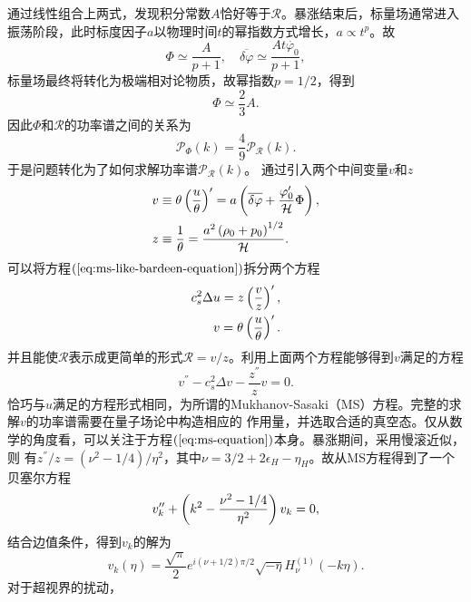 通过线性组合上两式，发现积分常数$A$恰好等于$\mathcal{R}$。暴涨结束后，标量场通常进入
振荡阶段，此时标度因子$a$以物理时间$t$的幂指数方式增长，$a\propto
t^{p}$。故
\begin{equation}
  \Phi \simeq \frac{A}{p+1},\quad 
  \overline{\delta\varphi}\simeq \frac{At\dot{\varphi_0}}{p+1},
\end{equation}
标量场最终将转化为极端相对论物质，故幂指数$p=1 /2$，得到
\begin{equation}
  \Phi \simeq \frac{2}{3}A. 
\end{equation}
因此$\Phi$和$\mathcal{R}$的功率谱之间的关系为
\begin{equation}
  \mathcal{P}_{\Phi}(k) = \frac{4}{9}\mathcal{P}_{\mathcal{R}}(k). 
\end{equation}
于是问题转化为了如何求解功率谱$\mathcal{P}_{\mathcal{R}}(k)$。
通过引入两个中间变量$v$和$z$
\begin{align}
  v&\equiv\theta\left(\frac{u}{\theta}\right)^{\prime} 
  =a\left(\overline{\delta\varphi} +
  \frac{\varphi^\prime_0}{\mathcal{H}}\Phi\right), \\
  z&\equiv \frac{1}{\theta} = \frac{a^2\left(\rho_0+p_0\right)^{1
  /2}}{\mathcal{H}}.
\end{align}
可以将方程$(\ref{eq:ms-like-bardeen-equation})$拆分两个方程
\begin{align}
  c_{s}^2\Delta u=z\left(\frac{v}{z}\right)^{\prime},\\
  v=\theta\left(\frac{u}{\theta}\right)^{\prime}.
\end{align}
并且能使$\mathcal{R}$表示成更简单的形式$\mathcal{R}=v
/z$。利用上面两个方程能够得到$v$满足的方程
\begin{equation}
  \label{eq:ms-equation}
  v^{\dprime}- c_s^2\Delta v - \frac{z^{\dprime}}{z}v = 0.
\end{equation}
恰巧与$u$满足的方程形式相同，为所谓的Mukhanov-Sasaki（MS）方程。完整的求解$v$的功率谱需要在量子场论中构造相应的
作用量，并选取合适的真空态。仅从数学的角度看，可以关注于方程$(\ref{eq:ms-equation})$本身。暴涨期间，采用慢滚近似，则
有$z^{\dprime} /z = (\nu^2-1 /4) /\eta^2$，其中$\nu=3
/2+2\epsilon_H-\eta_H$。故从MS方程得到了一个贝塞尔方程
\begin{equation}
  v^{\prime\prime}_k +\left(k^2-\frac{\nu^2-1 /4}{\eta^2}\right)v_{k} =0, 
\end{equation}
结合边值条件，得到$v_{k}$的解为
\begin{equation}
  v_{k}(\eta) = \frac{\sqrt{\pi}}{2}e^{i(\nu+1 /2)\pi
  /2}\sqrt{-\eta}H^{(1)}_{\nu}(-k\eta).
\end{equation}
对于超视界的扰动，
